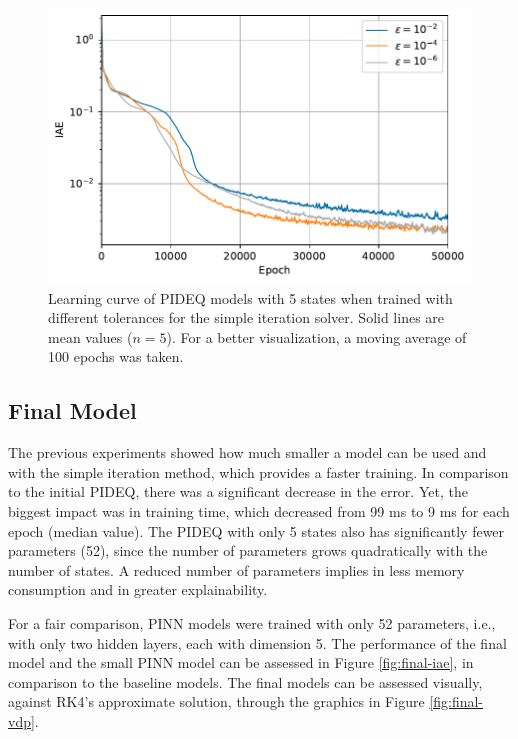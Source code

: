 \begin{figure}[h]
    \centering
    \includegraphics{images/exp_6_iae.pdf}
    \caption{Learning curve of \gls{PIDEQ} models with 5 states when trained with different tolerances for the simple iteration solver. Solid lines are mean values ($n=5$). For a better visualization, a moving average of 100 epochs was taken.}
    \label{fig:epsilon-iae}
\end{figure}

\subsection{Final Model}

The previous experiments showed how much smaller a model can be used and with the simple iteration method, which provides a faster training.
In comparison to the initial \gls{PIDEQ}, there was a significant decrease in the error.
Yet, the biggest impact was in training time, which decreased from 99 ms to 9 ms for each epoch (median value). 
The \gls{PIDEQ} with only 5 states also has significantly fewer parameters (52), since the number of parameters grows quadratically with the number of states.
A reduced number of parameters implies in less memory consumption and in greater explainability.

For a fair comparison, \gls{PINN} models were trained with only 52 parameters, i.e., with only two hidden layers, each with dimension 5.
The performance of the final model and the small \gls{PINN} model can be assessed in Figure \ref{fig:final-iae}, in comparison to the baseline models. The final models can be assessed visually, against \gls{RK4}'s approximate solution, through the graphics in Figure \ref{fig:final-vdp}.

